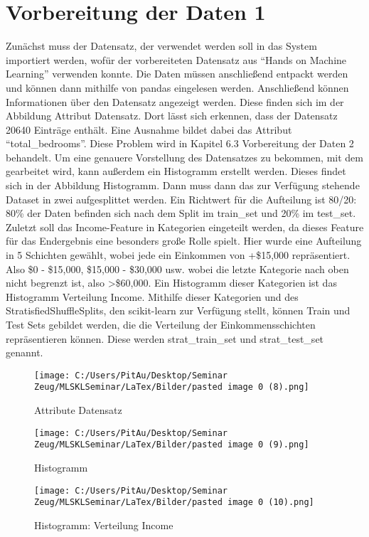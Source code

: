 \section{Vorbereitung der Daten 1}
\label{VorbereitungDerDaten1}
Zunächst muss der Datensatz, der verwendet werden soll in das System importiert werden, wofür der vorbereiteten Datensatz aus “Hands on Machine Learning” verwenden konnte\cite{DATA}. Die Daten müssen anschließend entpackt werden und können dann mithilfe von pandas eingelesen werden. 
Anschließend können Informationen über den Datensatz angezeigt werden. Diese finden sich im der Abbildung Attribut Datensatz. Dort lässt sich erkennen, dass der Datensatz 20640 Einträge enthält. Eine Ausnahme bildet dabei das Attribut “total\_bedrooms”. Diese Problem wird in Kapitel 6.3 Vorbereitung der Daten 2 behandelt.
Um eine genauere Vorstellung des Datensatzes zu bekommen, mit dem gearbeitet wird, kann außerdem ein Histogramm erstellt werden. Dieses findet sich in der Abbildung Histogramm. 
Dann muss dann das zur Verfügung stehende Dataset in zwei aufgesplittet werden. Ein Richtwert für die Aufteilung ist 80/20: 80\% der Daten befinden sich nach dem Split im train\_set und 20\% im test\_set.
Zuletzt soll das Income-Feature in Kategorien eingeteilt werden, da dieses Feature für das Endergebnis eine besonders große Rolle spielt. Hier wurde eine Aufteilung in 5 Schichten gewählt, wobei jede ein Einkommen von +\$15,000 repräsentiert. 
Also \$0 - \$15,000, \$15,000 - \$30,000 usw. wobei die letzte Kategorie nach oben nicht begrenzt ist, also >\$60,000. Ein Histogramm dieser Kategorien ist das Histogramm Verteilung Income. Mithilfe dieser Kategorien und des StratisfiedShuffleSplits, den scikit-learn zur Verfügung stellt, können Train und Test Sets gebildet werden, die die Verteilung der Einkommensschichten repräsentieren können. Diese werden strat\_train\_set und strat\_test\_set genannt.

\begin{figure}
	\texttt{[image: C:/Users/PitAu/Desktop/Seminar Zeug/MLSKLSeminar/LaTex/Bilder/pasted image 0 (8).png]}
	\caption{Attribute Datensatz}
\end{figure}
\begin{figure}
	\texttt{[image: C:/Users/PitAu/Desktop/Seminar Zeug/MLSKLSeminar/LaTex/Bilder/pasted image 0 (9).png]}
	\caption{Histogramm}
\end{figure}
\begin{figure}
	\texttt{[image: C:/Users/PitAu/Desktop/Seminar Zeug/MLSKLSeminar/LaTex/Bilder/pasted image 0 (10).png]}
	\caption{Histogramm: Verteilung Income}
\end{figure}


